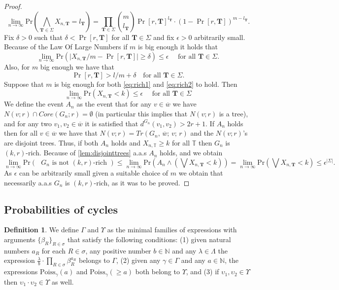 \documentclass[12pt,notitlepage,a4paper]{article}
\theoremstyle{definition}
\newtheorem{definition}{Definition}[section]
\newcommand{\N}{\mathbb{N}}
\newcommand{\Ln}{\lim\limits_{n\to \infty}}
\begin{document}
\begin{proof}
	\[
	\Ln
	\mathrm{Pr}\left(
	\bigwedge_{\mathbf{T}\in \Sigma} X_{n,\mathbf{T}}=l_\mathbf{T}
	\right)= 
	\prod_{\mathbf{T}\in \Sigma} \binom{m}{l_\mathbf{T}}
	\Pr[r,\mathbf{T}]^{l_\mathbf{T}}\cdot (1-\Pr[r,\mathbf{T}] )^{m-l_\mathbf{T}}.
	\] 
	Fix $\delta>0$ such that $\delta< \Pr[r,\mathbf{T}]$ 
	for all $\mathbf{T}\in \Sigma$ and fix $\epsilon>0$ arbitrarily small.
	Because of the Law Of Large Numbers if $m$ is big enough it holds that
	\begin{equation}\label{eq:rich1}
	\Ln
	\mathrm{Pr}\left(
	\big| X_{n,\mathbf{T}}/m - \Pr[r,\mathbf{T}] \big| \geq \delta	
	\right) \leq \epsilon \quad \text{ for all $\mathbf{T}\in \Sigma$.}
	\end{equation}
	Also, for $m$ big enough we have that
	\begin{equation}\label{eq:rich2}
		\Pr[r,\mathbf{T}] > l/m + \delta \quad \text{for all $\mathbf{T}\in \Sigma$}.
	\end{equation}
	Suppose that $m$ is big enough for both \cref{eq:rich1} and \cref{eq:rich2}
	to hold. Then 
	\[
	\Ln
	\mathrm{Pr}\left(
	X_{n,\mathbf{T}} < k  \right) \leq \epsilon \quad \text{ for all $\mathbf{T}\in \Sigma$}
	\]
	We define the
	event $A_n$ as the event that
	for any $v\in \overline{w}$ we have
	$N(v;r)\cap Core(G_n;r)=\emptyset$ 
	(in particular this implies that $N(v;r)$ is a tree),
	and for any two $v_1,v_2\in \overline{w}$
	it is satisfied that	
	$d^{G_n}(v_1,v_2)>2r+1$.
	If $A_n$ holds then	for all	$v\in \overline{w}$ we have that
	$N(v;r)=Tr(G_n,\,\overline{w};\,v;\,r)$ and
	the $N(v;r)$'s are disjoint trees. 
	Thus, if both $A_n$ holds and $X_{n,\mathbb{T}}\geq k$ for all $\mathbb{T}$ then 
	$G_n$ is $(k,r)$-rich. Because of \cref{lem:disjointtrees} a.a.s $A_n$ holds, and we
	obtain
	\[
	\Ln \mathrm{Pr}\left(
	\text{ $G_n$ is not
	$(k,r)$-rich }	
	\right) \leq 
	\Ln \mathrm{Pr}\left(
	A_n \wedge \left(
	\bigvee X_{n,\mathbf{T}}<k
	\right)
	\right) =
	\Ln \mathrm{Pr}\left(
	\bigvee X_{n,\mathbf{T}}<k
	\right)	
	\leq \epsilon^{|\Sigma|}.
	\]
	As $\epsilon$ can be arbitrarily small given a suitable choice of $m$ we
	obtain that necessarily a.a.s $G_n$ is $(k,r)$-rich, as it was to be proved. 
\end{proof}
		
\subsection{Probabilities of cycles}
	
\begin{definition}
	We define $\Gamma$ and $\Upsilon$ as the minimal families of expressions with arguments
	$\{\beta_R\}_{R\in \sigma}$ that satisfy the following conditions:
	(1) given natural numbers $a_R$ for each $R\in \sigma$, any positive number $b\in \N$
	and any $\lambda\in \Lambda$ the expression $\frac{\lambda}{b}\cdot \prod_{R\in \sigma} \beta_R^{a_R}$
	belongs to $\Gamma$, 
	(2) given any $\gamma\in \Gamma$ and any $a\in \N$, the expressions $\mathrm{Poiss}_\gamma(a)$
	and $\mathrm{Poiss}_{\gamma}(\geq a)$ both belong to $\Upsilon$, and
	(3) if $\upsilon_1, \upsilon_2\in \Upsilon$ then 
	$\upsilon_1\cdot \upsilon_2 \in \Upsilon$ as well. 
\end{definition}
\end{document}
